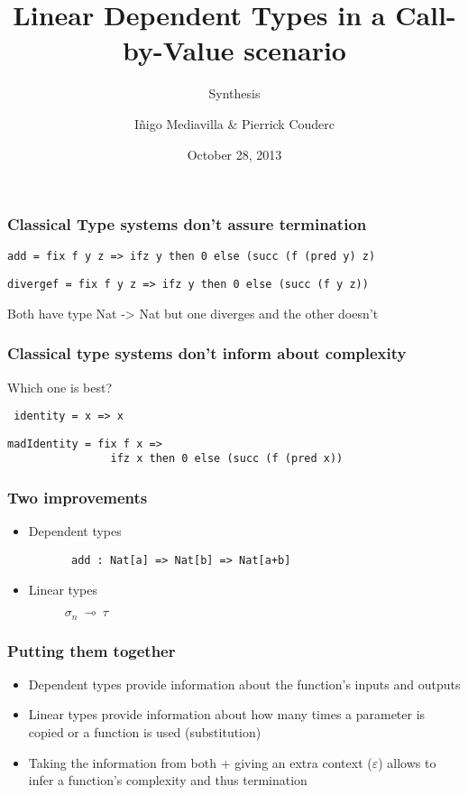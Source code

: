 \documentclass{beamer}
\title{Linear Dependent Types in a Call-by-Value scenario}
\subtitle{Synthesis}
\author{I\~{n}igo Mediavilla \& Pierrick Couderc}
\date{October 28, 2013}
\begin{document}
\begin{frame}
  \maketitle
\end{frame}

\begin{frame}[fragile]
\frametitle{Classical Type systems don't assure termination}


\begin{verbatim}
add = fix f y z => ifz y then 0 else (succ (f (pred y) z)
\end{verbatim}

\begin{verbatim}
divergef = fix f y z => ifz y then 0 else (succ (f y z))
\end{verbatim}
Both have type Nat -> Nat but one diverges and the other doesn't
\end{frame}

\begin{frame}[fragile]
\frametitle{Classical type systems don't inform about complexity}
Which one is best? 
\begin{verbatim}
 identity = x => x 
\end{verbatim}
\begin{verbatim}
madIdentity = fix f x => 
                ifz x then 0 else (succ (f (pred x))
\end{verbatim}
\end{frame}

\begin{frame}[fragile]
\frametitle{Two improvements}
\begin{itemize}
\item Dependent types
\begin{figure}
\begin{verbatim}
 add : Nat[a] => Nat[b] => Nat[a+b]
\end{verbatim}
\end{figure}
\item Linear types \\
\begin{figure}
\begin{center}
$\sigma_{n}~\multimap~\tau$
\end{center}
\end{figure}
\end{itemize}
\end{frame}

\begin{frame}[fragile]
\frametitle{Putting them together}
\begin{itemize}
\item Dependent types provide information about the function's inputs and outputs

\item Linear types provide information about how many times a parameter is
  copied or a function is used (substitution)

\item Taking the information from both + giving an extra context
($\varepsilon$) allows to infer a function's complexity and thus termination
\end{itemize}
\end{frame}
\end{document}
